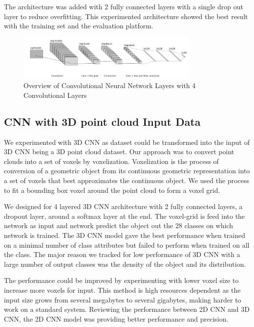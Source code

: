 The architecture was added with 2 fully connected layers with a single drop out layer to reduce overfitting.
This experimented architecture showed the best result with the training set and the evaluation platform.

\begin{figure}[!h]
     \begin{center}
       \includegraphics[width=0.8\textwidth]{./images/object_net.pdf}
       \caption{Overview of Convolutional Neural Network Layers with 4 Convolutional Layers}
       \label{fig:cnn}
     \end{center}
\end{figure}

\subsection{CNN with 3D point cloud Input Data}
We experimented with 3D CNN as dataset could be transformed into the input of 3D CNN being a 3D point cloud dataset.
Our approach was to convert point clouds into a set of voxels by voxelization. Voxelization is the process of conversion of a geometric object from its continuous geometric representation into a set of voxels that best approximates the continuous
object. We used the process to fit a bounding box voxel around the point cloud to form a voxel grid.

We designed for 4 layered 3D CNN architecture with 2 fully connected layers, a dropout layer, around a softmax layer at the end.
The voxel-grid is feed into the network as input and network predict the object out the 28 classes on which network is trained.
The 3D CNN model gave the best performance when trained on a minimal number of class attributes but failed to perform when trained on all the class.
The major reason we tracked for low performance of 3D CNN with a large number of output classes was the density of the object and its distribution.

The performance could be improved by experimenting with lower voxel size to increase more voxels for input.
This method is high resources dependent as the input size grows from several megabytes to several gigabytes, making harder to work on a standard system.
Reviewing the performance between 2D CNN and 3D CNN, the 2D CNN model was providing better performance and precision.
